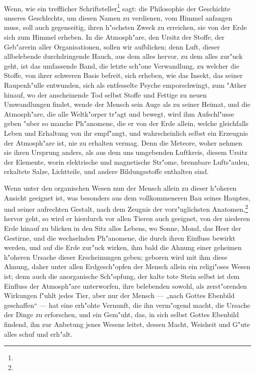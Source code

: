 \documentclass[a4paper, 11pt, oneside, polutonikogreek, german]{article}
\begin{document}
\paragraph{}
Wenn, wie ein trefflicher Schriftsteller\footnote{} sagt: die Philosophie der Geschichte unseres Geschlechts, um diesen Namen zu verdienen, vom Himmel anfangen muss, soll auch gegenseitig, ihren h"ochsten Zweck zu erreichen, sie von der Erde sich zum Himmel erheben. In die Atmosph"are, den Ursitz der Stoffe, der Geb"arerin aller Organisationen, sollen wir aufblicken; denn Luft, dieser allbelebende durchdringende Hauch, aus dem alles hervor, zu dem alles zur"uck geht, ist das umfassende Band, die letzte sch"one Verwandlung, zu welcher die Stoffe, von ihrer schweren Basis befreit, sich erheben, wie das Insekt, das seiner Raupenh"ulle entwunden, sich als entfesselte Psyche emporschwingt, zum "Ather hinauf, wo der anscheinende Tod selbst Stoffe und Fettige zu neuen Umwandlungen findet, wende der Mensch sein Auge als zu seiner Heimat, und die Atmosph"are, die alle Weltk"orper tr"agt und bewegt, wird ihm Aufschl"usse geben "uber so manche Ph"anomene, die er von der Erde allein, welche gleichfalls Leben und Erhaltung von ihr empf"angt, und wahrscheinlich selbst ein Erzeugnis der Atmosph"are ist, nie zu erhalten vermag. Denn die Meteore, woher nehmen sie ihren Ursprung anders, als aus dem uns umgebenden Luftkreis, diesem Ursitz der Elemente, worin elektrische und magnetische Str"ome, brennbare Lufts"aulen, erkaltete Salze, Lichtteile, und andere Bildungsstoffe enthalten sind.

Wenn unter den organischen Wesen nun der Mensch allein zu dieser h"oheren Ansicht geeignet ist, was besonders aus dem vollkommeneren Bau seines Hauptes, und seiner aufrechten Gestalt, nach dem Zeugnis der vorz"uglichsten Anatomen,\footnote{} hervor geht, so wird er hierdurch vor allen Tieren auch geeignet, von der niederen Erde hinauf zu blicken in den Sitz alles Lebens, wo Sonne, Mond, das Heer der Gestirne, und die wechselnden Ph"anomene, die durch ihren Einfluss bewirkt werden, und auf die Erde zur"uck wirken, ihm bald die Ahnung einer geheimen h"oheren Ursache dieser Erscheinungen geben; geboren wird mit ihm diese Ahnung, daher unter allen Erdgesch"opfen der Mensch allein ein religi"oses Wesen ist; denn auch die anorganische Sch"opfung, der kalte tote Stein selbst ist dem Einfluss der Atmosph"are unterworfen, ihre belebenden sowohl, als zerst"orenden Wirkungen f"uhlt jedes Tier, aber nur der Mensch --- „nach Gottes Ebenbild geschaffen“ --- hat eine erh"ohte Vernunft, die ihn verm"ogend macht, die Ursache der Dinge zu erforschen, und ein Gem"uht, das, in sich selbst Gottes Ebenbild findend, ihn zur Anbetung jenes Wesens leitet, dessen Macht, Weisheit und G"ute alles schuf und erh"alt.
\end{document}
